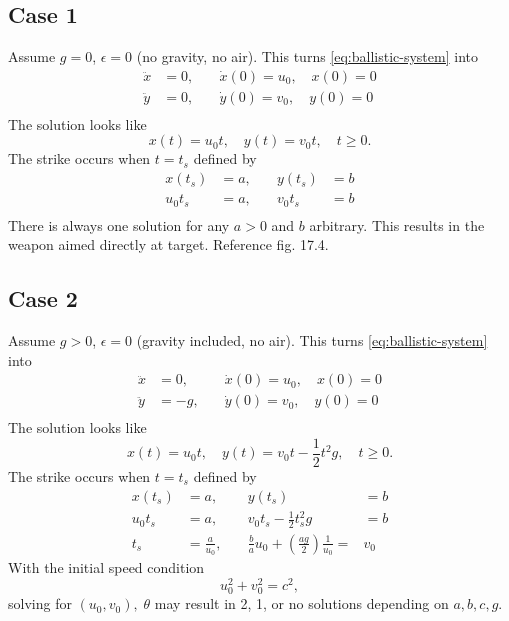 \documentclass[12pt,twoside]{article}
\begin{document}
\subsection{Case 1}
Assume $g=0$, $\epsilon=0$ (no gravity, no air).
This turns \cref{eq:ballistic-system} into
\begin{equation*}
  \begin{aligned}
    \ddot{x}&=0, &\quad \dot{x}(0)=u_0,\quad x(0)=0 \\
    \ddot{y}&=0, &\quad \dot{y}(0)=v_0,\quad y(0)=0 \\
  \end{aligned}
\end{equation*}
The solution looks like
$$x(t) = u_0t, \quad y(t) = v_0t,\quad t\ge0.$$
The strike occurs when $t=t_s$ defined by
\begin{equation*}
  \begin{aligned}
    x(t_s) &= a, &\quad y(t_s)&=b \\
    u_0t_s &= a, &\quad v_0t_s&=b \\
  \end{aligned}
\end{equation*}
There is always one solution for any $a>0$ and $b$ arbitrary. This results in
the weapon aimed directly at target. Reference fig. 17.4.

\subsection{Case 2}
Assume $g>0$, $\epsilon=0$ (gravity included, no air).
This turns \cref{eq:ballistic-system} into
\begin{equation*}
  \begin{aligned}
    \ddot{x}&=0, &\quad \dot{x}(0)=u_0,\quad x(0)=0 \\
    \ddot{y}&=-g, &\quad \dot{y}(0)=v_0,\quad y(0)=0 \\
  \end{aligned}
\end{equation*}
The solution looks like
$$x(t) = u_0t, \quad y(t) = v_0t-\frac{1}{2}t^2g,\quad t\ge0.$$
The strike occurs when $t=t_s$ defined by
\begin{equation*}
  \begin{aligned}
    x(t_s) &= a, &\quad y(t_s)&=b \\
    u_0t_s &= a, &\quad v_0t_s-\frac{1}{2}t_s^2g&=b \\
    t_s &= \frac{a}{u_0}, &\quad \frac{b}{a}u_0+\left(\frac{ag}{2}\right)\frac{1}{u_0} =& v_0
  \end{aligned}
\end{equation*}
With the initial speed condition $$u_0^2+v_0^2=c^2,$$ solving for
$(u_0,v_0),\;\theta$ may result in 2, 1, or no solutions depending on $a,b,c,g$.
\end{document}
